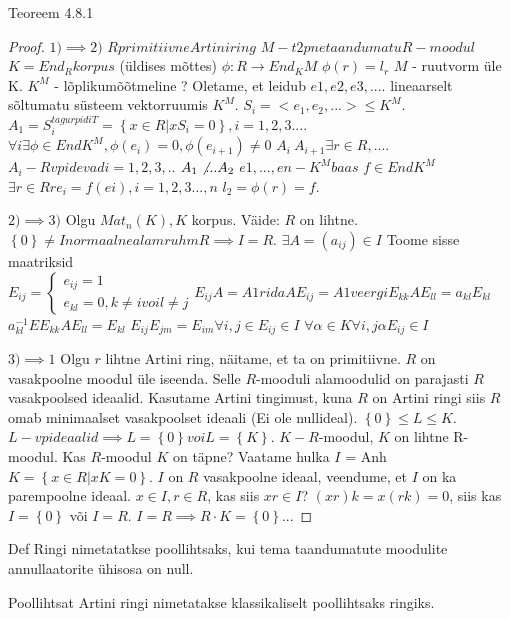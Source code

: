 \documentclass[12pt]{report}
\numberwithin{equation}{section}
\theoremstyle{definition}
\theoremstyle{plain}
\begin{document}
Teoreem 4.8.1

\begin{proof}
$1) \implies 2)$
$R primitiivne Artini ring$
$M - t2pne taandumatu R-moodul$
$K = End_R  korpus$ (\"uldises mõttes)
$\phi: R \to End_K M$
$\phi(r) = l_r$
$M $ - ruutvorm \"ule K.
$K^M$ - lõplikumõõtmeline ?
Oletame, et leidub $e1,e2,e3,.... $ lineaarselt sõltumatu s\"usteem vektorruumis $K^M$. 
$S_i=<e_1,e_2,...> \leq K^M$.
$A_1 = S_i^{tagurpidiT} = \left\lbrace x \in R | x S_i = 0 \right\rbrace , i = 1,2,3....$
$\forall i \exists \phi \in End K^M , \phi(e_i) = 0, \phi(e_{i+1}) \neq 0$
$A_i \ A_{i+1} \exists r \in R, ....$
$A_i - R vpidevad i=1,2,3,..$
$A_1 \not ... A_2 $
$e1,...,en - K^M baas$
$f \in End K^M$
$\exists r \in R r e_i = f(ei), i=1,2,3...,n$
$l_2 = \phi(r)=f$.

$2) \implies 3)$
Olgu $Mat_n(K), K$ korpus.
Väide: $R$ on lihtne.
$\left\lbrace 0 \right\rbrace \neq I normaalnealamruhm R \implies I = R$.
$\exists A = (a_{ij}) \in I$
Toome sisse maatriksid $E_{ij} =
\begin{cases}
e_{ij} = 1 \\
e_{kl} = 0, k \neq i voi l \neq j
\end{cases}
E_{ij}A = A 1 rida
AE_{ij} = A 1 veergi
E_{kk}AE_{ll} = a_{kl}E_{kl}$
$a^{-1}_{kl}EE_{kk}AE_{ll} = E_{kl}$
$E_{ij}E_{jm}=E_{im} \forall i,j \in E_{ij} \in I$
$\forall \alpha \in K \forall i,j \alpha E_{ij} \in I$

$3) \implies 1$
Olgu $r$ lihtne Artini ring, näitame, et ta on primitiivne.
$R$ on vasakpoolne moodul \"ule iseenda. Selle $R$-mooduli alamoodulid on parajasti $R$ vasakpoolsed ideaalid. Kasutame Artini tingimust, kuna $R$ on Artini ringi siis $R$ omab minimaalset vasakpoolset ideaali (Ei ole nullideal). $\left\lbrace 0 \right\rbrace \leq L \leq K$. $L - vp ideaalid \implies L = \left\lbrace 0 \right\rbrace voi L = \left\lbrace K \right\rbrace$.
$K - R$-moodul, $K$ on lihtne R-moodul. Kas $R$-moodul $K$ on täpne? Vaatame hulka $I$ = Anh$K = \left\lbrace x \in R | x K = 0 \right\rbrace$. $I$ on $R$ vasakpoolne ideaal, veendume, et $I$ on ka parempoolne ideaal. $x \in I, r \in R$, kas siis $xr \in I$? $(xr)k = x(rk) = 0$, siis kas $I = \left\lbrace 0 \right\rbrace$ või $I = R$. $I = R \implies R \cdot K = \left\lbrace 0 \right\rbrace$...
\end{proof}

Def Ringi nimetatatkse poollihtsaks, kui tema taandumatute moodulite annullaatorite \"uhisosa on null.

Poollihtsat Artini ringi nimetatakse klassikaliselt poollihtsaks ringiks.
\end{document}
